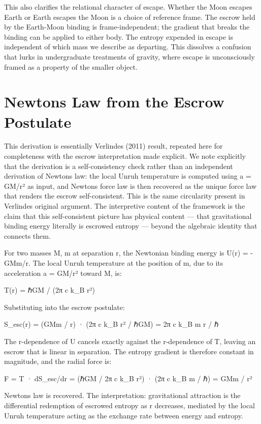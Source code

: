 \documentclass[11pt]{article}
\begin{document}
This also clarifies the relational character of escape. Whether the Moon escapes Earth or Earth escapes the Moon is a choice of reference frame. The escrow held by the Earth-Moon binding is frame-independent; the gradient that breaks the binding can be applied to either body. The entropy expended in escape is independent of which mass we describe as departing. This dissolves a confusion that lurks in undergraduate treatments of gravity, where \textquotesingle escape\textquotesingle{} is unconsciously framed as a property of the smaller object.

\section{Newton\textquotesingle s Law from the Escrow Postulate}\label{newtons-law-from-the-escrow-postulate}

This derivation is essentially Verlinde\textquotesingle s (2011) result, repeated here for completeness with the escrow interpretation made explicit. We note explicitly that the derivation is a self-consistency check rather than an independent derivation of Newton\textquotesingle s law: the local Unruh temperature is computed using a = GM/r² as input, and Newton\textquotesingle s force law is then recovered as the unique force law that renders the escrow self-consistent. This is the same circularity present in Verlinde\textquotesingle s original argument. The interpretive content of the framework is the claim that this self-consistent picture has physical content --- that gravitational binding energy literally is escrowed entropy --- beyond the algebraic identity that connects them.

For two masses M, m at separation r, the Newtonian binding energy is U(r) = -GMm/r. The local Unruh temperature at the position of m, due to its acceleration a = GM/r² toward M, is:

T(r) = ℏGM / (2π c k\_B r²)

Substituting into the escrow postulate:

S\_esc(r) = (GMm / r) · (2π c k\_B r² / ℏGM) = 2π c k\_B m r / ℏ

The r-dependence of U cancels exactly against the r-dependence of T, leaving an escrow that is linear in separation. The entropy gradient is therefore constant in magnitude, and the radial force is:

F = T · dS\_esc/dr = (ℏGM / 2π c k\_B r²) · (2π c k\_B m / ℏ) = GMm / r²

Newton\textquotesingle s law is recovered. The interpretation: gravitational attraction is the differential redemption of escrowed entropy as r decreases, mediated by the local Unruh temperature acting as the exchange rate between energy and entropy.
\end{document}
